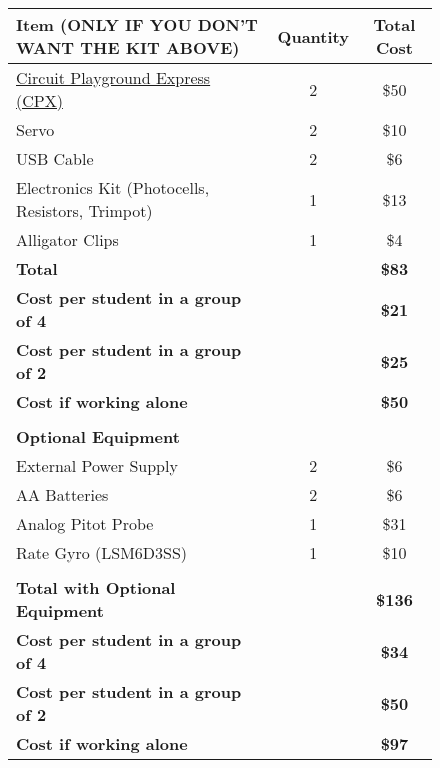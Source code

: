\documentclass{article}
\begin{document}
\begin{figure}[H]
  \begin{center}
    \begin{tabular}{|l|c|c|}
      \hline
      Item (ONLY IF YOU DON’T WANT THE KIT ABOVE) & Quantity & Total
      Cost \\
      \hline
      \href{https://www.adafruit.com/product/3333}{Circuit Playground Express (CPX)} & 2 & \$50 \\
      \hline
      Servo & 2 & \$10 \\
      \hline
      USB Cable & 2 & \$6 \\
      \hline
      Electronics Kit (Photocells, Resistors, Trimpot) & 1 & \$13 \\
      \hline
      Alligator Clips & 1 & \$4 \\
      \hline
      {\bf Total} & & {\bf \$83} \\
      \hline
      {\bf Cost per student in a group of 4} & & {\bf \$21} \\
      \hline
      {\bf Cost per student in a group of 2} & & {\bf \$25} \\
      \hline
      {\bf Cost if working alone} & & {\bf \$50} \\
      \hline
       & & \\
      \hline
      {\bf Optional Equipment} & & \\
      \hline
      External Power Supply & 2 & \$6 \\
      \hline
      AA Batteries & 2 & \$6 \\
      \hline
      Analog Pitot Probe & 1 & \$31 \\
      \hline
      Rate Gyro (LSM6D3SS) & 1 & \$10 \\
      \hline
      & & \\
      \hline
      {\bf Total with Optional Equipment} & & {\bf \$136} \\
      \hline
      {\bf Cost per student in a group of 4} & & {\bf \$34} \\
      \hline
      {\bf Cost per student in a group of 2} & & {\bf \$50} \\
      \hline
      {\bf Cost if working alone} & & {\bf \$97} \\
      \hline
    \end{tabular}
  \end{center}
\end{figure}
\end{document}
